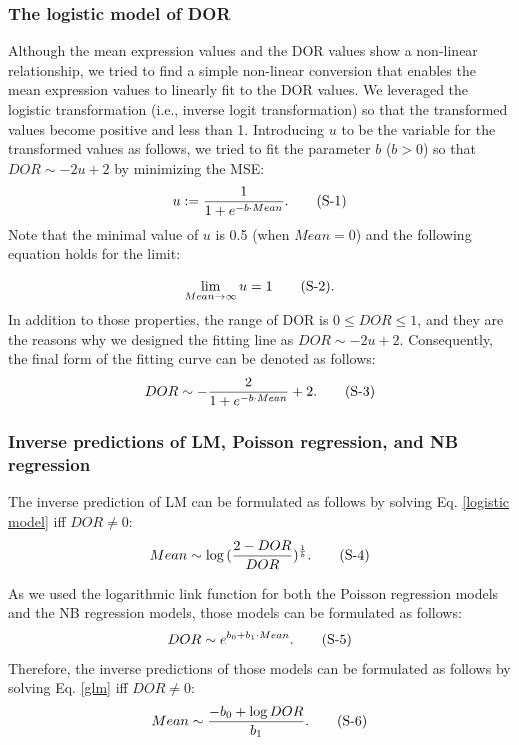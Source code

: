 \documentclass{article}
\begin{document}
\subsubsection*{
  The logistic model of DOR
}
Although the mean expression values and the DOR values show a non-linear relationship, we tried to find a simple 
non-linear conversion that enables the mean expression values to linearly fit to the DOR values. We leveraged the 
logistic transformation (i.e., inverse logit transformation) so that the transformed values become positive and less 
than 1. Introducing $u$ to be the variable for the transformed values as follows, we tried to fit the parameter $b$ ($b>0$) 
so that $DOR\sim -2u + 2$ by minimizing the MSE:
\begin{equation}\label{logistic transformation}
  u := \frac{1}{1+e^{-b\cdot Mean}}.
  \stepcounter{equation} \tag{S-\theequation}
\end{equation}
Note that the minimal value of $u$ is 0.5 (when $Mean=0$) and the following equation holds for the limit:

\begin{equation}\label{lim}
  \lim_{Mean\rightarrow\infty}u=1
  \stepcounter{equation} \tag{S-\theequation}.
\end{equation}
In addition to those properties, the range of DOR is $0\leq DOR\leq 1$, and they are the reasons why we designed the 
fitting line as $DOR\sim -2u + 2$. Consequently, the final form of the fitting curve can be denoted as follows:
\begin{equation}\label{logistic model}
  DOR\sim -\frac{2}{1+e^{-b\cdot Mean}}+2.
  \stepcounter{equation} \tag{S-\theequation}
\end{equation}

\subsubsection*{Inverse predictions of LM, Poisson regression, and NB regression}
The inverse prediction of LM can be formulated as follows by solving Eq. \eqref{logistic model} iff $DOR\neq 0$:
\begin{equation}\label{inverse lm}
  Mean\sim\log{(\frac{2-DOR}{DOR})^\frac{1}{b}}.
  \stepcounter{equation} \tag{S-\theequation}
\end{equation}

As we used the logarithmic link function for both the Poisson regression models and the NB regression models, 
those models can be formulated as follows:
\begin{equation}\label{glm}
  DOR\sim e^{b_0+b_1\cdot Mean}.
  \stepcounter{equation} \tag{S-\theequation}
\end{equation}
Therefore, the inverse predictions of those models can be formulated as follows by solving Eq. \eqref{glm} iff $DOR\neq 0$:
\begin{equation}\label{inverse glm}
  Mean\sim\frac{-b_0+\log{DOR}}{b_1}.
  \stepcounter{equation} \tag{S-\theequation}
\end{equation}
\end{document}
